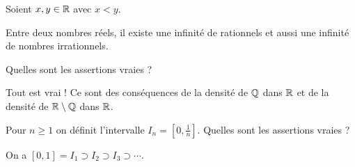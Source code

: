 \begin{question}
Soient $x,y \in \mathbb{R}$ avec $x<y$.
\begin{answers}



\end{answers}
\begin{explanations}
Entre deux nombres réels, il existe une infinité de rationnels et aussi une infinité de nombres irrationnels.
\end{explanations}
\end{question}


\begin{question}
Quelles sont les assertions vraies ?
\begin{answers}



    
\end{answers}
\begin{explanations}
Tout est vrai ! Ce sont des conséquences de la densité de $\mathbb{Q}$ dans $\mathbb{R}$ et de la densité de $\mathbb{R} \setminus \mathbb{Q}$ dans $\mathbb{R}$.
\end{explanations}
\end{question}

\begin{question}
Pour $n\ge 1$ on définit l'intervalle $I_n = [0,\frac1n]$. 
Quelles sont les assertions vraies ?
\begin{answers}


    \bad{L'union de tous les $I_n$ (pour $n$ parcourant $\Nn^*$) est $[0,+\infty[$.}

\end{answers}
\begin{explanations}
On a $[0,1] = I_1 \supset I_2 \supset I_3 \supset \cdots$.
\end{explanations}
\end{question}



